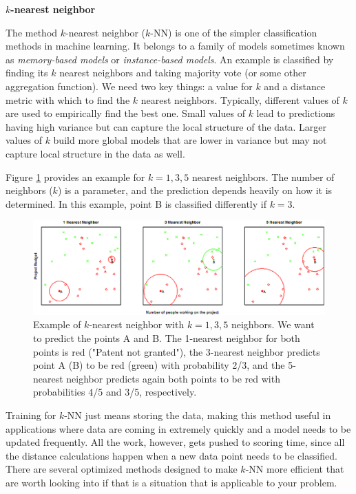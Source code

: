 \documentclass[]{krantz}
\begin{document}
\textbf{\(k\)-nearest neighbor}

The method \(k\)-nearest neighbor (\(k\)-NN) is one of the simpler
classification methods in machine learning. It belongs to a family of
models sometimes known as \emph{memory-based models} or
\emph{instance-based models}. An example is classified by finding its
\(k\) nearest neighbors and taking majority vote (or some other
aggregation function). We need two key things: a value for \(k\) and a
distance metric with which to find the \(k\) nearest neighbors.
Typically, different values of \(k\) are used to empirically find the
best one. Small values of \(k\) lead to predictions having high variance
but can capture the local structure of the data. Larger values of \(k\)
build more global models that are lower in variance but may not capture
local structure in the data as well.

Figure \ref{fig:knn} provides an example for \(k = 1, 3, 5\) nearest
neighbors. The number of neighbors (\(k\)) is a parameter, and the
prediction depends heavily on how it is determined. In this example,
point B is classified differently if \(k = 3\).

\begin{figure}

{\centering \includegraphics[width=0.7\linewidth]{ChapterML/figures/knn} 

}

\caption{Example of $k$-nearest neighbor with $k = 1, 3, 5$ neighbors. We want to predict the points A and B. The 1-nearest neighbor for both points is red ("Patent not granted"), the 3-nearest neighbor predicts point A (B) to be red (green) with probability 2/3, and the 5-nearest neighbor predicts again both points to be red with probabilities 4/5 and 3/5, respectively.}\label{fig:knn}
\end{figure}

\vspace*{-6pt} Training for \(k\)-NN just means storing the data, making
this method useful in applications where data are coming in extremely
quickly and a model needs to be updated frequently. All the work,
however, gets pushed to scoring time, since all the distance
calculations happen when a new data point needs to be classified. There
are several optimized methods designed to make \(k\)-NN more efficient
that are worth looking into if that is a situation that is applicable to
your problem.
\end{document}

